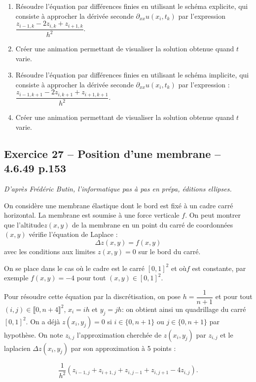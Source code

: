 \documentclass[10pt,fleqn]{article} %
\begin{document}
\begin{multicols}{2}
\begin{enumerate}
\item Résoudre l'équation par différences finies en utilisant le schéma explicite, qui consiste à approcher la dérivée seconde $\partial_{xx} u(x_i,t_k)$ par l'expression $\dfrac{z_{i-1,k}-2z_{i,k}+z_{i+1,k}}{h^2}$.
\item Créer une animation permettant de visualiser la solution obtenue quand $t$ varie. 
\item Résoudre l'équation par différences finies en utilisant le schéma implicite, qui consiste à approcher la dérivée seconde $\partial_{xx} u(x_i,t_k)$ par l'expression :
$\dfrac{z_{i-1,k+1}-2z_{i,k+1}+z_{i+1,k+1}}{h^2}$.
\item Créer une animation permettant de visualiser la solution obtenue quand $t$ varie. 
\end{enumerate}

\subsection*{Exercice 27 -- Position d'une membrane -- 4.6.49 p.153}
\begin{flushright}
\textit{D'après Frédéric Butin, l'informatique pas à pas en prépa, éditions ellipses.}
\end{flushright}

On considère une membrane élastique dont le bord est fixé à un cadre carré horizontal. La membrane est soumise à une force verticale $f$. On peut montrer que l'altitude$z(x,y)$ de la membrane en un point du carré de coordonnées $(x,y)$ vérifie l'équation de Laplace :
$$
\Delta z\left( x,y\right) = f(x,y)
$$
 avec les conditions aux limites $z(x,y)=0$ sur le bord du carré. 
 
 On se place dans le cas où le cadre est le carré $[0,1]^2$ et où$f$ est constante, par exemple $f(x,y)=-4$ pour tout $(x,y)\in[0,1]^2$. 
 
 Pour résoudre cette équation par la discrétisation, on pose $h=\dfrac{1}{n+1}$ et pour tout $(i,j)\in \llbracket 0,n+4 \rrbracket^2$, $x_i=ih$ et $y_j=jh$: on obtient ainsi un quadrillage du carré $[0,1]^2$. On a déjà $z\left(x_i,y_j\right)=0$  si $i\in \{0,n+1\}$ ou $j \in \{0,n+1\}$ par hypothèse. On note $z_{i,j}$ l'approximation cherchée de $z\left(x_i,y_j\right)$ par $z_{i,j}$ et le laplacien $\Delta z\left(x_i,y_j\right)$ par son approximation à 5 points : 
 
 $$
 \dfrac{1}{h^2}\left( z_{i-1,j}+z_{i+1,j}+z_{i,j-1}+z_{i,j+1}-4z_{i,j}\right).
 $$
 

\end{multicols}
\end{document}
